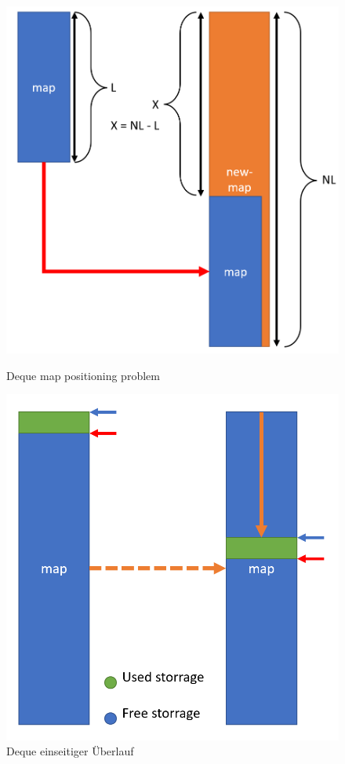 \documentclass{TUBAFarbeiten}
\begin{document}
\begin{figure}
\includegraphics[scale=0.3]{MapAlloc}
\caption{Deque map positioning problem}
\label{fig:Img4}
\includegraphics[scale=0.325]{MoveMap}
\caption{Deque einseitiger Überlauf}
\label{fig:Img5}
\end{figure}
\end{document}
